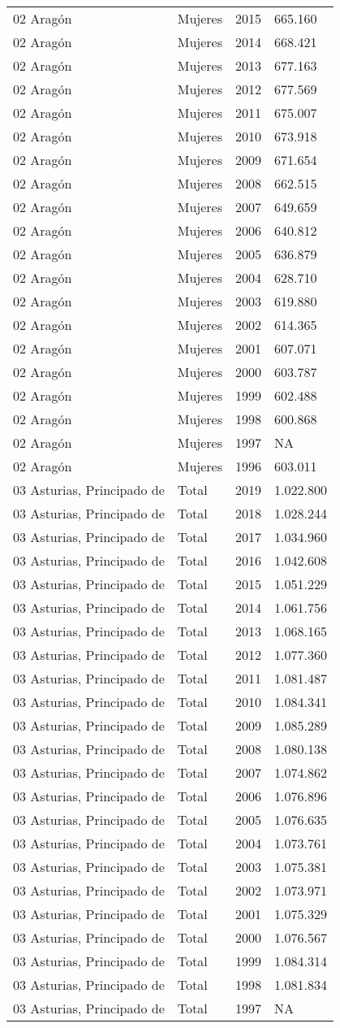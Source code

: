 \documentclass[
]{article}
\begin{document}
\begin{longtable}[]{@{}llrl@{}}
02 Aragón & Mujeres & 2015 & 665.160\tabularnewline
02 Aragón & Mujeres & 2014 & 668.421\tabularnewline
02 Aragón & Mujeres & 2013 & 677.163\tabularnewline
02 Aragón & Mujeres & 2012 & 677.569\tabularnewline
02 Aragón & Mujeres & 2011 & 675.007\tabularnewline
02 Aragón & Mujeres & 2010 & 673.918\tabularnewline
02 Aragón & Mujeres & 2009 & 671.654\tabularnewline
02 Aragón & Mujeres & 2008 & 662.515\tabularnewline
02 Aragón & Mujeres & 2007 & 649.659\tabularnewline
02 Aragón & Mujeres & 2006 & 640.812\tabularnewline
02 Aragón & Mujeres & 2005 & 636.879\tabularnewline
02 Aragón & Mujeres & 2004 & 628.710\tabularnewline
02 Aragón & Mujeres & 2003 & 619.880\tabularnewline
02 Aragón & Mujeres & 2002 & 614.365\tabularnewline
02 Aragón & Mujeres & 2001 & 607.071\tabularnewline
02 Aragón & Mujeres & 2000 & 603.787\tabularnewline
02 Aragón & Mujeres & 1999 & 602.488\tabularnewline
02 Aragón & Mujeres & 1998 & 600.868\tabularnewline
02 Aragón & Mujeres & 1997 & NA\tabularnewline
02 Aragón & Mujeres & 1996 & 603.011\tabularnewline
03 Asturias, Principado de & Total & 2019 & 1.022.800\tabularnewline
03 Asturias, Principado de & Total & 2018 & 1.028.244\tabularnewline
03 Asturias, Principado de & Total & 2017 & 1.034.960\tabularnewline
03 Asturias, Principado de & Total & 2016 & 1.042.608\tabularnewline
03 Asturias, Principado de & Total & 2015 & 1.051.229\tabularnewline
03 Asturias, Principado de & Total & 2014 & 1.061.756\tabularnewline
03 Asturias, Principado de & Total & 2013 & 1.068.165\tabularnewline
03 Asturias, Principado de & Total & 2012 & 1.077.360\tabularnewline
03 Asturias, Principado de & Total & 2011 & 1.081.487\tabularnewline
03 Asturias, Principado de & Total & 2010 & 1.084.341\tabularnewline
03 Asturias, Principado de & Total & 2009 & 1.085.289\tabularnewline
03 Asturias, Principado de & Total & 2008 & 1.080.138\tabularnewline
03 Asturias, Principado de & Total & 2007 & 1.074.862\tabularnewline
03 Asturias, Principado de & Total & 2006 & 1.076.896\tabularnewline
03 Asturias, Principado de & Total & 2005 & 1.076.635\tabularnewline
03 Asturias, Principado de & Total & 2004 & 1.073.761\tabularnewline
03 Asturias, Principado de & Total & 2003 & 1.075.381\tabularnewline
03 Asturias, Principado de & Total & 2002 & 1.073.971\tabularnewline
03 Asturias, Principado de & Total & 2001 & 1.075.329\tabularnewline
03 Asturias, Principado de & Total & 2000 & 1.076.567\tabularnewline
03 Asturias, Principado de & Total & 1999 & 1.084.314\tabularnewline
03 Asturias, Principado de & Total & 1998 & 1.081.834\tabularnewline
03 Asturias, Principado de & Total & 1997 & NA\tabularnewline

\end{longtable}
\end{document}
